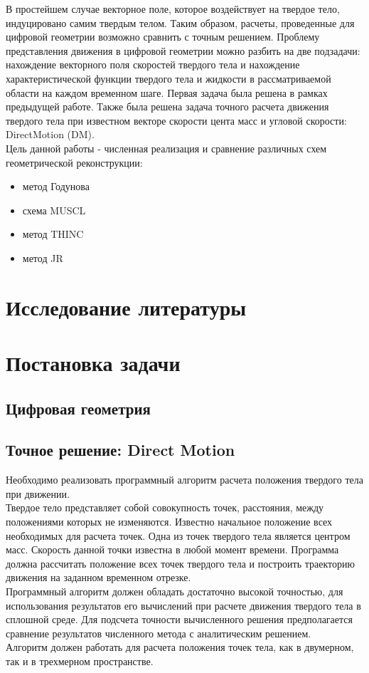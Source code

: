 \documentclass[12pt,a4paper]{article}
\begin{document}
В простейшем случае векторное поле, которое воздействует на твердое тело, индуцировано самим твердым телом. Таким образом, расчеты, проведенные для цифровой геометрии возможно сравнить с точным решением. Проблему представления движения в цифровой геометрии можно разбить на две подзадачи: нахождение векторного поля скоростей твердого тела и нахождение характеристической функции твердого тела и жидкости в рассматриваемой области на каждом временном шаге. Первая задача была решена в рамках предыдущей работе. Также была решена задача точного расчета движения твердого тела при известном векторе скорости цента масс и угловой скорости: DirectMotion (DM).\\
Цель данной работы - численная реализация и сравнение различных схем геометрической реконструкции:
\begin{itemize}
  \item метод Годунова
  \item схема MUSCL
  \item метод THINC
  \item метод JR
\end{itemize}


\section{Исследование литературы}

\section{Постановка задачи}


\subsection{Цифровая геометрия}
\subsection{Точное решение: Direct Motion}
Необходимо реализовать программный алгоритм расчета положения твердого тела при движении.\\
Твердое тело представляет собой совокупность точек, расстояния, между положениями которых не изменяются. Известно начальное положение всех необходимых для расчета точек. Одна из точек твердого тела является центром масс. Скорость данной точки известна в любой момент времени. Программа должна рассчитать положение всех точек твердого тела и построить траекторию движения на заданном временном отрезке.\\
Программный алгоритм должен обладать достаточно высокой точностью, для использования результатов его вычислений при расчете движения твердого тела в сплошной среде. Для подсчета точности вычисленного решения предполагается сравнение результатов численного метода с аналитическим решением.\\
Алгоритм должен работать для расчета положения точек тела, как в двумерном, так и в трехмерном пространстве.
\end{document}
